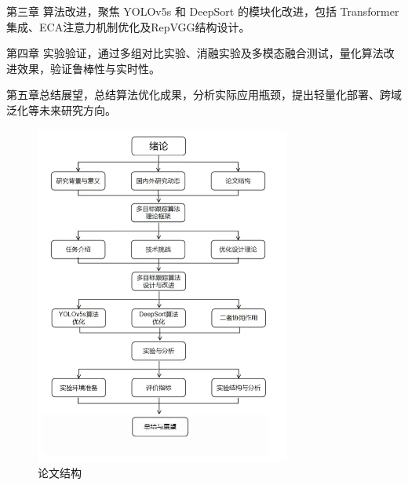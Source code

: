 第三章 算法改进，聚焦 YOLOv5s 和 DeepSort 的模块化改进，包括 Transformer 集成、ECA注意力机制优化及RepVGG结构设计。

第四章 实验验证，通过多组对比实验、消融实验及多模态融合测试，量化算法改进效果，验证鲁棒性与实时性。

第五章总结展望，总结算法优化成果，分析实际应用瓶颈，提出轻量化部署、跨域泛化等未来研究方向。


\begin{figure}[htbp] %
	\centering
	\includegraphics[width=0.75\textwidth]{np14} %
	\caption{论文结构} %
	\label{fig:np14} %
\end{figure}

